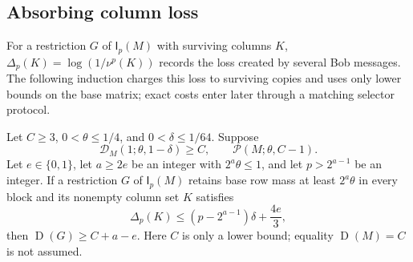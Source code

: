 \documentclass[11pt]{article} \usepackage[utf8]{inputenc}
\theoremstyle{plain} \newtheorem{theorem}{Theorem}[section]
\theoremstyle{definition} \newaliascnt{definition}{theorem}
\newcommand{\D}{\operatorname{D}}
\newcommand{\Int}[2]{\mathsf{I}_{#1}(#2)}
\newcommand{\RP}[3]{\mathcal{P}(#1;#2,#3)}
\begin{document}
\subsection{Absorbing column loss}

For a restriction $G$ of $\Int{p}{M}$ with surviving columns $K$,
$\Delta_p(K)=\log(1/\nu^p(K))$ records the loss created by several Bob
messages. The following induction charges this loss to surviving copies and uses
only lower bounds on the base matrix; exact costs enter later through a matching
selector protocol.

\begin{lemma}\label{cl:defect-induction}
Let $C\ge3$, $0<\theta\le1/4$, and $0<\delta\le1/64$.
Suppose
\[
\mathcal D_M(1;\theta,1-\delta)\ge C,\qquad\RP{M}{\theta}{C-1}.
\]
Let $e\in\{0,1\}$, let $a\ge2e$ be an integer with $2^a\theta\le1$, and let
$p>2^{a-1}$ be an integer. If a restriction $G$ of $\Int{p}{M}$ retains base
row mass at least $2^a\theta$ in every block and its nonempty column set $K$ satisfies
\[
\Delta_p(K)\le(p-2^{a-1})\delta+\frac{4e}{3},
\]
then $\D(G)\ge C+a-e$. Here $C$ is only a lower bound; equality $\D(M)=C$ is not
assumed.
\end{lemma}
\end{document}
